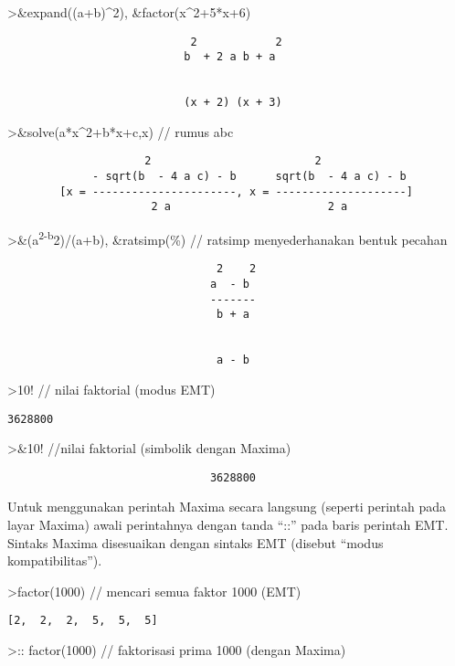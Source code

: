 \documentclass[
]{book}
\begin{document}
\textgreater\&expand((a+b)\^{}2), \&factor(x\^{}2+5*x+6)

\begin{verbatim}
                            2            2
                           b  + 2 a b + a


                           (x + 2) (x + 3)
\end{verbatim}

\textgreater\&solve(a*x\^{}2+b*x+c,x) // rumus abc

\begin{verbatim}
                     2                         2
             - sqrt(b  - 4 a c) - b      sqrt(b  - 4 a c) - b
        [x = ----------------------, x = --------------------]
                      2 a                        2 a
\end{verbatim}

\textgreater\&(a\textsuperscript{2-b}2)/(a+b), \&ratsimp(\%) // ratsimp menyederhanakan bentuk pecahan

\begin{verbatim}
                                2    2
                               a  - b
                               -------
                                b + a


                                a - b
\end{verbatim}

\textgreater10! // nilai faktorial (modus EMT)

\begin{verbatim}
3628800
\end{verbatim}

\textgreater\&10! //nilai faktorial (simbolik dengan Maxima)

\begin{verbatim}
                               3628800
\end{verbatim}

Untuk menggunakan perintah Maxima secara langsung (seperti perintah pada layar Maxima) awali perintahnya dengan tanda ``::'' pada baris perintah EMT. Sintaks Maxima disesuaikan dengan sintaks EMT (disebut ``modus kompatibilitas'').

\textgreater factor(1000) // mencari semua faktor 1000 (EMT)

\begin{verbatim}
[2,  2,  2,  5,  5,  5]
\end{verbatim}

\textgreater:: factor(1000) // faktorisasi prima 1000 (dengan Maxima)
\end{document}
